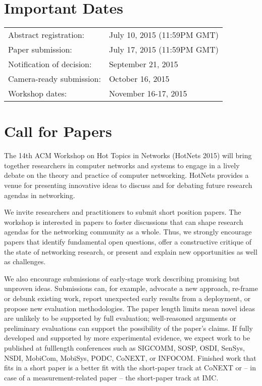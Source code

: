 \documentclass{hotnets15}
\begin{document}
\section{Important Dates}

{
\small 
\begin{tabular}{ll}
Abstract registration: 	        & July 10, 2015 (11:59PM GMT) \\
Paper submission: 	        & July 17, 2015 (11:59PM GMT) \\
Notification of decision: 	& September 21, 2015 \\
Camera-ready submission: 	& October 16, 2015 \\
Workshop dates: 	        & November 16-17, 2015 \\
\end{tabular}
}
\section{Call for Papers}

The 14th ACM Workshop on Hot Topics in Networks (HotNets 2015) will
bring together researchers in computer networks and systems to engage
in a lively debate on the theory and practice of computer networking.
HotNets provides a venue for presenting innovative ideas to discuss
and for debating future research agendas in networking.

We invite researchers and practitioners to submit short position
papers. The workshop is interested in papers to foster discussions
that can shape research agendas for the networking community as a
whole. Thus, we strongly encourage papers that identify fundamental
open questions, offer a constructive critique of the state of
networking research, or present and explain new opportunities as well
as challenges.

We also encourage submissions of early-stage work describing promising
but unproven ideas. Submissions can, for example, advocate a new
approach, re-frame or debunk existing work, report unexpected early
results from a deployment, or propose new evaluation
methodologies. The paper length limits mean novel ideas are unlikely
to be supported by full evaluation; well-reasoned arguments or
preliminary evaluations can support the possibility of the paper's
claims. If fully developed and supported by more experimental
evidence, we expect work to be published at fulllength conferences
such as SIGCOMM, SOSP, OSDI, SenSys, NSDI, MobiCom, MobiSys, PODC,
CoNEXT, or INFOCOM. Finished work that fits in a short paper is a
better fit with the short-paper track at CoNEXT or -- in case of a
measurement-related paper -- the short-paper track at IMC.
\end{document}
